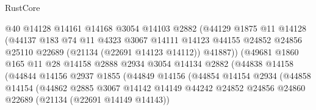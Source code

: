 \begin{lexlean}{RustCore}
\begin{coremodule}
                              @40
                              @14128
                              @14161
                              @14168
                              @3054
                              @14103
                              @2882
                              (@44129
                                @1875
                                @11
                                @14128
                                (@44137
                                  @183
                                  @74
                                  @11
                                  @4323
                                  @3067
                                  @14111
                                  @14123
                                  @44155
                                  @24852
                                  @24856
                                  @25110
                                  @22689
                                  (@21134 (@22691 @14123 @14112))
                                  @41887))
                              (@49681
                                @1860
                                @165
                                @11
                                @28
                                @14158
                                @2888
                                @2934
                                @3054
                                @14134
                                @2882
                                (@44838
                                  @14158
                                  (@44844
                                    @14156
                                    @2937
                                    @1855
                                    (@44849
                                      @14156
                                      (@44854
                                        @14154
                                        @2934
                                        (@44858
                                          @14154
                                          (@44862
                                            @2885
                                            @3067
                                            @14142
                                            @14149
                                            @44242
                                            @24852
                                            @24856
                                            @24860
                                            @22689
                                            (@21134 (@22691 @14149 @14143))

\end{coremodule}
\end{lexlean}
